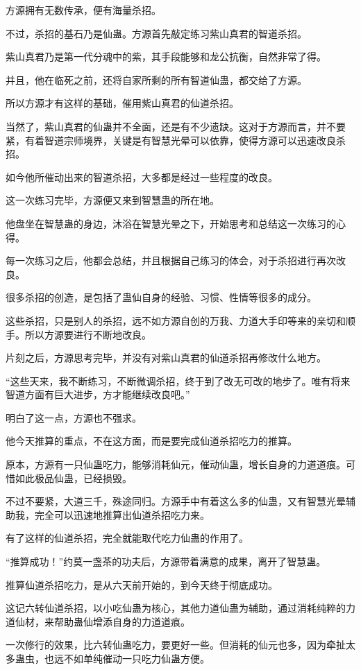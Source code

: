 \begin{this_body}
方源拥有无数传承，便有海量杀招。

不过，杀招的基石乃是仙蛊。方源首先敲定练习紫山真君的智道杀招。

紫山真君乃是第一代分魂中的紫，其手段能够和龙公抗衡，自然非常了得。

并且，他在临死之前，还将自家所剩的所有智道仙蛊，都交给了方源。

所以方源才有这样的基础，催用紫山真君的仙道杀招。

当然了，紫山真君的仙蛊并不全面，还是有不少遗缺。这对于方源而言，并不要紧，有着智道宗师境界，关键是有智慧光晕可以依靠，使得方源可以迅速改良杀招。

如今他所催动出来的智道杀招，大多都是经过一些程度的改良。

这一次练习完毕，方源便又来到智慧蛊的所在地。

他盘坐在智慧蛊的身边，沐浴在智慧光晕之下，开始思考和总结这一次练习的心得。

每一次练习之后，他都会总结，并且根据自己练习的体会，对于杀招进行再次改良。

很多杀招的创造，是包括了蛊仙自身的经验、习惯、性情等很多的成分。

这些杀招，只是别人的杀招，远不如方源自创的万我、力道大手印等来的亲切和顺手。所以方源要进行不断地改良。

片刻之后，方源思考完毕，并没有对紫山真君的仙道杀招再修改什么地方。

“这些天来，我不断练习，不断微调杀招，终于到了改无可改的地步了。唯有将来智道方面有巨大进步，方才能继续改良吧。”

明白了这一点，方源也不强求。

他今天推算的重点，不在这方面，而是要完成仙道杀招吃力的推算。

原本，方源有一只仙蛊吃力，能够消耗仙元，催动仙蛊，增长自身的力道道痕。可惜如此极品仙蛊，已经损毁。

不过不要紧，大道三千，殊途同归。方源手中有着这么多的仙蛊，又有智慧光晕辅助我，完全可以迅速地推算出仙道杀招吃力来。

有了这样的仙道杀招，完全就能取代吃力仙蛊的作用了。

“推算成功！”约莫一盏茶的功夫后，方源带着满意的成果，离开了智慧蛊。

推算仙道杀招吃力，是从六天前开始的，到今天终于彻底成功。

这记六转仙道杀招，以小吃仙蛊为核心，其他力道仙蛊为辅助，通过消耗纯粹的力道仙材，来帮助蛊仙增添自身的力道道痕。

一次修行的效果，比六转仙蛊吃力，要更好一些。但消耗的仙元也多，因为牵扯太多蛊虫，也远不如单纯催动一只吃力仙蛊方便。


\end{this_body}
